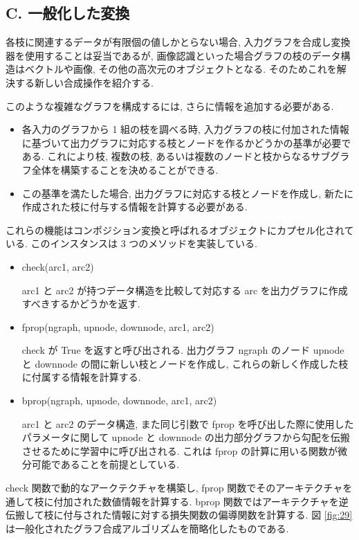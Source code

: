 \documentclass[twocolumn]{jarticle}     %
\begin{document}
\subsection*{C. 一般化した変換}
各枝に関連するデータが有限個の値しかとらない場合, 入力グラフを合成し変換器を使用することは妥当であるが, 画像認識といった場合グラフの枝のデータ構造はベクトルや画像, その他の高次元のオブジェクトとなる. そのためこれを解決する新しい合成操作を紹介する. 
\par
このような複雑なグラフを構成するには, さらに情報を追加する必要がある. 
\begin{itemize}
  \item 各入力のグラフから 1 組の枝を調べる時, 入力グラフの枝に付加された情報に基づいて出力グラフに対応する枝とノードを作るかどうかの基準が必要である. これにより枝, 複数の枝, あるいは複数のノードと枝からなるサブグラフ全体を構築することを決めることができる.
  \item この基準を満たした場合, 出力グラフに対応する枝とノードを作成し, 新たに作成された枝に付与する情報を計算する必要がある.
\end{itemize}
これらの機能はコンポジション変換と呼ばれるオブジェクトにカプセル化されている. 
このインスタンスは 3 つのメソッドを実装している.
\begin{itemize}
  \item check(arc1, arc2)
  \par
  arc1 と arc2 が持つデータ構造を比較して対応する arc を出力グラフに作成すべきするかどうかを返す.
  \item fprop(ngraph, upnode, downnode, arc1, arc2)
  \par
  check が True を返すと呼び出される. 出力グラフ ngraph のノード upnode と downnode の間に新しい枝とノードを作成し, これらの新しく作成した枝に付属する情報を計算する.
  \item bprop(ngraph, upnode, downnode, arc1, arc2)
  \par
  arc1 と arc2 のデータ構造, また同じ引数で fprop を呼び出した際に使用したパラメータに関して upnode と downnode の出力部分グラフから勾配を伝搬させるために学習中に呼び出される. 
  これは fprop の計算に用いる関数が微分可能であることを前提としている.
\end{itemize}
check 関数で動的なアークテクチャを構築し, fprop 関数でそのアーキテクチャを通して枝に付加された数値情報を計算する. bprop 関数ではアーキテクチャを逆伝搬して枝に付与された情報に対する損失関数の偏導関数を計算する. 
図 \ref{fig:29} は一般化されたグラフ合成アルゴリズムを簡略化したものである. 
\end{document}
